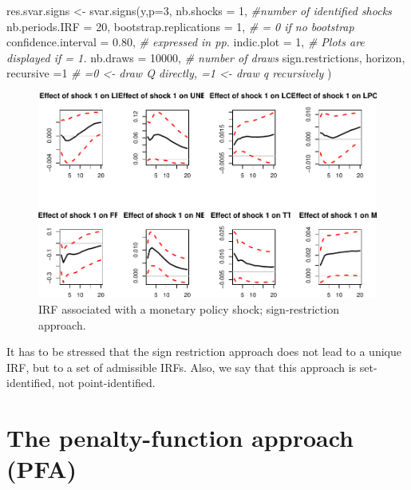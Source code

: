 \documentclass[
  12pt,
]{book}
\newenvironment{Shaded}{\begin{snugshade}}{\end{snugshade}}
\newcommand{\AttributeTok}[1]{\textcolor[rgb]{0.77,0.63,0.00}{#1}}
\newcommand{\CommentTok}[1]{\textcolor[rgb]{0.56,0.35,0.01}{\textit{#1}}}
\newcommand{\DecValTok}[1]{\textcolor[rgb]{0.00,0.00,0.81}{#1}}
\newcommand{\FloatTok}[1]{\textcolor[rgb]{0.00,0.00,0.81}{#1}}
\newcommand{\FunctionTok}[1]{\textcolor[rgb]{0.00,0.00,0.00}{#1}}
\newcommand{\NormalTok}[1]{#1}
\newcommand{\OtherTok}[1]{\textcolor[rgb]{0.56,0.35,0.01}{#1}}
\theoremstyle{definition}
\theoremstyle{definition}
\theoremstyle{definition}
\theoremstyle{definition}
\theoremstyle{remark}
\begin{document}
\begin{Shaded}
\begin{Highlighting}[]
\NormalTok{res.svar.signs }\OtherTok{\textless{}{-}} 
  \FunctionTok{svar.signs}\NormalTok{(y,}\AttributeTok{p=}\DecValTok{3}\NormalTok{,}
             \AttributeTok{nb.shocks =} \DecValTok{1}\NormalTok{, }\CommentTok{\#number of identified shocks}
             \AttributeTok{nb.periods.IRF =} \DecValTok{20}\NormalTok{,}
             \AttributeTok{bootstrap.replications =} \DecValTok{1}\NormalTok{, }\CommentTok{\# = 0 if no bootstrap}
             \AttributeTok{confidence.interval =} \FloatTok{0.80}\NormalTok{, }\CommentTok{\# expressed in pp.}
             \AttributeTok{indic.plot =} \DecValTok{1}\NormalTok{, }\CommentTok{\# Plots are displayed if = 1.}
             \AttributeTok{nb.draws =} \DecValTok{10000}\NormalTok{, }\CommentTok{\# number of draws}
\NormalTok{             sign.restrictions,}
\NormalTok{             horizon,}
             \AttributeTok{recursive =}\DecValTok{1} \CommentTok{\#  =0 \textless{}{-} draw Q directly, =1 \textless{}{-} draw q recursively}
\NormalTok{  )}
\end{Highlighting}
\end{Shaded}

\begin{figure}
\includegraphics[width=0.95\linewidth]{IdentifStructShocks_files/figure-latex/signrestr1-1} \caption{IRF associated with a monetary policy shock; sign-restriction approach.}\label{fig:signrestr1}
\end{figure}

It has to be stressed that the sign restriction approach does not lead to a unique IRF, but to a set of admissible IRFs. Also, we say that this approach is set-identified, not point-identified.

\hypertarget{the-penalty-function-approach-pfa}{%
\section{The penalty-function approach (PFA)}\label{the-penalty-function-approach-pfa}}
\end{document}

